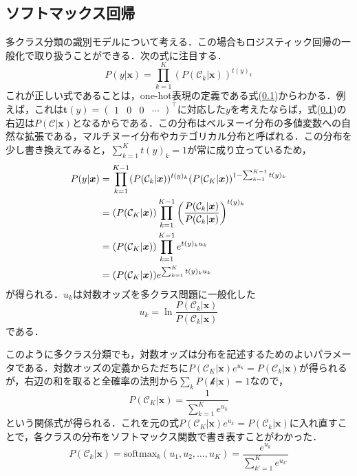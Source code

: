 \documentclass[a4paper,11pt]{jsreport}
\begin{document}
\subsection{ソフトマックス回帰}
多クラス分類の識別モデルについて考える．この場合もロジスティック回帰の一般化で取り扱うことができる．次の式に注目する．
\begin{equation}
  P(y | \bm{x}) 
  = \prod_{k=1}^{K} (P(\mathcal{C}_k | \bm{x}))^{t(y)_k}
\end{equation}
これが正しい式であることは，one-hot表現の定義である式(\ref{})からわかる．例えば，これは$\bm{t}(y) = \begin{pmatrix} 1 & 0 & 0 & \cdots \end{pmatrix}^{\top}$に対応した$y$を考えたならば，式(\ref{})の右辺は$P(\mathcal{C} | \bm{x})$となるからである．この分布はベルヌーイ分布の多値変数への自然な拡張である，マルチヌーイ分布やカテゴリカル分布と呼ばれる．この分布を少し書き換えてみると，$\sum_{k=1}^{K} t(y)_k = 1$が常に成り立っているため，
\begin{align}
  P(y | \bm{x}) 
  &= \prod_{k=1}^{K-1} (P(\mathcal{C}_k | \bm{x}))^{t(y)_k} (P(\mathcal{C}_K | \bm{x}))^{1 - \sum_{k=1}^{K-1} t(y)_k} \notag \\
  &= (P(\mathcal{C}_K | \bm{x})) \prod_{k=1}^{K-1} \left( \frac{P(\mathcal{C}_k | \bm{x})}{P(\mathcal{C}_k | \bm{x})} \right)^{t(y)_k} \notag \\
  &= (P(\mathcal{C}_K | \bm{x})) \prod_{k=1}^{K-1} e^{t(y)_k u_k} \notag \\
  &= (P(\mathcal{C}_K | \bm{x})) e^{\sum_{k=1}^{K} t(y)_k u_k} 
\end{align}
が得られる．$u_k$は対数オッズを多クラス問題に一般化した
\begin{equation}
  u_k = \ln{\frac{P(\mathcal{C}_k | \bm{x})}{P(\mathcal{C}_k | \bm{x})}}
\end{equation}
である．\par
このように多クラス分類でも，対数オッズは分布を記述するためのよいパラメータである．対数オッズの定義からただちに$P(\mathcal{C}_K | \bm{x}) e^{u_k} = P(\mathcal{C}_k | \bm{x})$が得られるが，右辺の和を取ると全確率の法則から$\sum_{k} P(\mathcal{k} | \bm{x}) = 1$なので，
\begin{equation}
  P(\mathcal{C}_K | \bm{x})
  = \frac{1}{\sum_{k=1}^{K} e^{u_k}}
\end{equation}
という関係式が得られる．これを元の式$P(\mathcal{C}_K | \bm{x}) e^{u_k} = P(\mathcal{C}_k | \bm{x})$に入れ直すことで，各クラスの分布をソフトマックス関数で書き表すことがわかった．
\begin{equation}
  P(\mathcal{C}_k | \bm{x})
  = \text{softmax}_k (u_1, u_2, \dots, u_K) 
  = \frac{e^{u_k}}{\sum_{k'=1}^{K} e^{u_{k'}}}
\end{equation}
\end{document}

